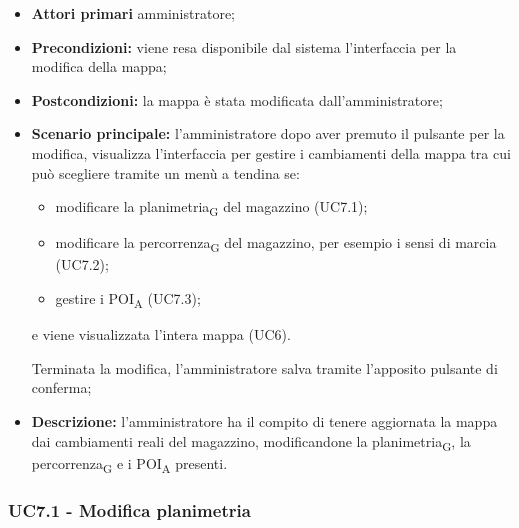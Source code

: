\begin{itemize}

   \item   \textbf{Attori primari} amministratore;

  \item   \textbf{Precondizioni:} viene resa disponibile dal sistema l'interfaccia per la modifica della mappa;

   \item   \textbf{Postcondizioni:} la mappa è stata modificata dall'amministratore;

  \item   \textbf{Scenario principale:} l'amministratore dopo aver premuto il pulsante per la modifica, visualizza l'interfaccia per gestire i cambiamenti della mappa tra cui può scegliere tramite un menù a tendina se:

   \begin{itemize}
     \item modificare la planimetria\textsubscript{G} del magazzino (UC7.1);

      \item modificare la percorrenza\textsubscript{G} del magazzino, per esempio i sensi di marcia (UC7.2);

      \item gestire i POI\textsubscript{A} (UC7.3);
  \end{itemize}

  e viene visualizzata l'intera mappa (UC6).

Terminata la modifica, l'amministratore salva tramite l'apposito pulsante di conferma;

 \item   \textbf{Descrizione:} l'amministratore ha il compito di tenere aggiornata la mappa dai cambiamenti reali del magazzino, modificandone la planimetria\textsubscript{G}, la percorrenza\textsubscript{G} e i POI\textsubscript{A} presenti.

\end{itemize}





\subsubsection{UC7.1 - Modifica planimetria}

